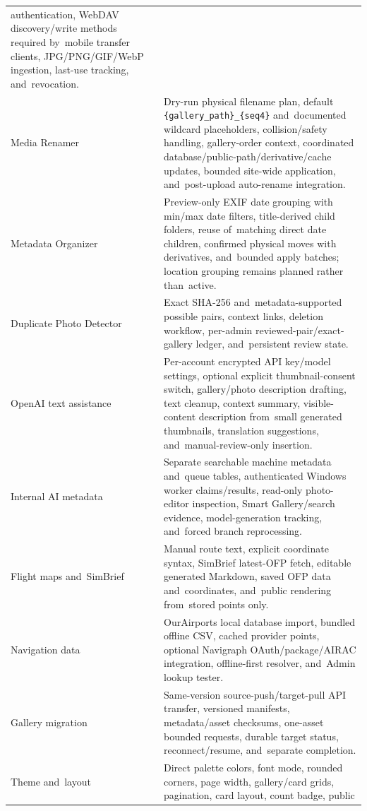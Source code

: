 \documentclass[11pt,a4paper]{article}
\newcommand{\codeword}[1]{\nolinkurl{#1}}
\begin{document}
\begin{longtable}{%
    >{\raggedright\arraybackslash}p{}%
    >{\raggedright\arraybackslash}p{}%
}
authentication, WebDAV discovery/write methods required by~mobile transfer
clients, JPG/PNG/GIF/WebP ingestion, last-use tracking, and~revocation.\\
Media Renamer & Dry-run physical filename plan, default
\codeword{\{gallery_path\}_\{seq4\}} and~documented wildcard placeholders,
collision/safety handling, gallery-order context, coordinated
database/public-path/derivative/cache updates, bounded site-wide application,
and~post-upload auto-rename integration.\\
Metadata Organizer & Preview-only EXIF date grouping with min/max date filters,
title-derived child folders, reuse of~matching direct date children, confirmed
physical moves with derivatives, and~bounded apply batches; location grouping
remains planned rather than~active.\\
Duplicate Photo Detector & Exact SHA-256 and~metadata-supported possible pairs,
context links, deletion workflow, per-admin reviewed-pair/exact-gallery ledger,
and~persistent review state.\\
OpenAI text assistance & Per-account encrypted API key/model settings, optional
explicit thumbnail-consent switch, gallery/photo description drafting, text
cleanup, context summary, visible-content description from~small generated
thumbnails, translation suggestions, and~manual-review-only insertion.\\
Internal AI metadata & Separate searchable machine metadata and~queue tables,
authenticated Windows worker claims/results, read-only photo-editor inspection,
Smart Gallery/search evidence, model-generation tracking, and~forced branch
reprocessing.\\
Flight maps and~SimBrief & Manual route text, explicit coordinate syntax,
SimBrief latest-OFP fetch, editable generated Markdown, saved OFP data
and~coordinates, and~public rendering from~stored points only.\\
Navigation data & OurAirports local database import, bundled offline CSV, cached
provider points, optional Navigraph OAuth/package/AIRAC integration,
offline-first resolver, and~Admin lookup tester.\\
Gallery migration & Same-version source-push/target-pull API transfer, versioned
manifests, metadata/asset checksums, one-asset bounded requests, durable target
status, reconnect/resume, and~separate completion.\\
Theme and~layout & Direct palette colors, font mode, rounded corners, page
width, gallery/card grids, pagination, card layout, count badge, public

\end{longtable}
\end{document}
